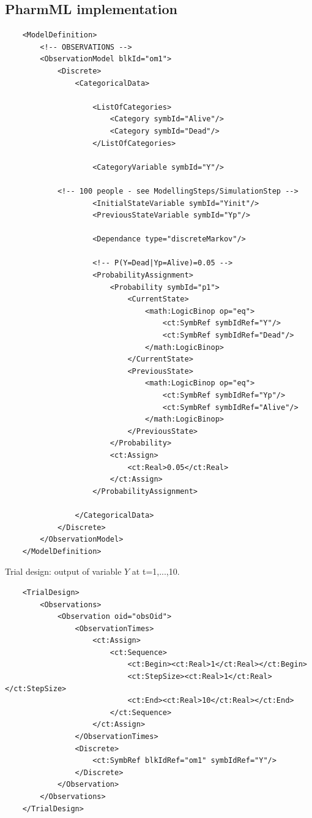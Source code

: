 \subsection*{PharmML implementation}

\lstset{language=XML}
\begin{lstlisting}
    <ModelDefinition>
        <!-- OBSERVATIONS -->
        <ObservationModel blkId="om1">
            <Discrete>
                <CategoricalData>
                    
                    <ListOfCategories> 
                        <Category symbId="Alive"/>
                        <Category symbId="Dead"/>
                    </ListOfCategories>
                    
                    <CategoryVariable symbId="Y"/>

		    <!-- 100 people - see ModellingSteps/SimulationStep -->
                    <InitialStateVariable symbId="Yinit"/>
                    <PreviousStateVariable symbId="Yp"/>
                    
                    <Dependance type="discreteMarkov"/>
                    
                    <!-- P(Y=Dead|Yp=Alive)=0.05 -->
                    <ProbabilityAssignment>
                        <Probability symbId="p1">
                            <CurrentState>
                                <math:LogicBinop op="eq">
                                    <ct:SymbRef symbIdRef="Y"/>
                                    <ct:SymbRef symbIdRef="Dead"/>
                                </math:LogicBinop>
                            </CurrentState>
                            <PreviousState>
                                <math:LogicBinop op="eq">
                                    <ct:SymbRef symbIdRef="Yp"/>
                                    <ct:SymbRef symbIdRef="Alive"/>
                                </math:LogicBinop>
                            </PreviousState>
                        </Probability>
                        <ct:Assign>
                            <ct:Real>0.05</ct:Real>
                        </ct:Assign>
                    </ProbabilityAssignment>
                    
                </CategoricalData>
            </Discrete>
        </ObservationModel>
    </ModelDefinition>
\end{lstlisting}
Trial design: output of variable $Y$ at t=1,...,10.
\lstset{language=XML}
\begin{lstlisting}
    <TrialDesign>
        <Observations>
            <Observation oid="obsOid">
                <ObservationTimes>
                    <ct:Assign>
                        <ct:Sequence>
                            <ct:Begin><ct:Real>1</ct:Real></ct:Begin>
                            <ct:StepSize><ct:Real>1</ct:Real></ct:StepSize>
                            <ct:End><ct:Real>10</ct:Real></ct:End>
                        </ct:Sequence>
                    </ct:Assign>
                </ObservationTimes>
                <Discrete>
                    <ct:SymbRef blkIdRef="om1" symbIdRef="Y"/>
                </Discrete>
            </Observation>
        </Observations>
    </TrialDesign>
\end{lstlisting}
